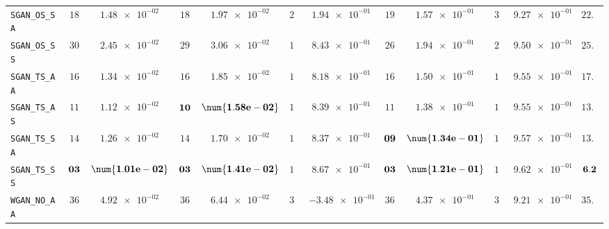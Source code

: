 \begin{xltabular}{\textwidth}{l||cC|cC|cC|cC|cC||c}
	\texttt{SGAN\_OS\_SA} & $ 18$ & $ \num{1.48e-02}$ & $ 18$ & $ \num{1.97e-02}$ & $ 25$ & $ \num{1.94e-01}$ & $ 19$ & $ \num{1.57e-01}$ & $ 34$ & $ \num{9.27e-01}$ & $ 22.8$  \\
	\texttt{SGAN\_OS\_SS} & $ 30$ & $ \num{2.45e-02}$ & $ 29$ & $ \num{3.06e-02}$ & $ 14$ & $ \num{8.43e-01}$ & $ 26$ & $ \num{1.94e-01}$ & $ 26$ & $ \num{9.50e-01}$ & $ 25.0$  \\
	\texttt{SGAN\_TS\_AA} & $ 16$ & $ \num{1.34e-02}$ & $ 16$ & $ \num{1.85e-02}$ & $ 18$ & $ \num{8.18e-01}$ & $ 16$ & $ \num{1.50e-01}$ & $ 19$ & $ \num{9.55e-01}$ & $ 17.0$  \\
	\texttt{SGAN\_TS\_AS} & $ 11$ & $ \num{1.12e-02}$ & $\bf 10$ & $\bf \num{1.58e-02}$ & $ 15$ & $ \num{8.39e-01}$ & $ 11$ & $ \num{1.38e-01}$ & $ 18$ & $ \num{9.55e-01}$ & $ 13.0$  \\
	\texttt{SGAN\_TS\_SA} & $ 14$ & $ \num{1.26e-02}$ & $ 14$ & $ \num{1.70e-02}$ & $ 16$ & $ \num{8.37e-01}$ & $\bf 09$ & $\bf \num{1.34e-01}$ & $ 16$ & $ \num{9.57e-01}$ & $ 13.8$  \\
	\texttt{SGAN\_TS\_SS} & $\bf 03$ & $\bf \num{1.01e-02}$ & $\bf 03$ & $\bf \num{1.41e-02}$ & $ 11$ & $ \num{8.67e-01}$ & $\bf 03$ & $\bf \num{1.21e-01}$ & $ 11$ & $ \num{9.62e-01}$ & $\bf 6.2$  \\ \midrule
	\texttt{WGAN\_NO\_AA} & $ 36$ & $ \num{4.92e-02}$ & $ 36$ & $ \num{6.44e-02}$ & $ 32$ & $ \num{-3.48e-01}$ & $ 36$ & $ \num{4.37e-01}$ & $ 35$ & $ \num{9.21e-01}$ & $ 35.0$  \\

\end{xltabular}
